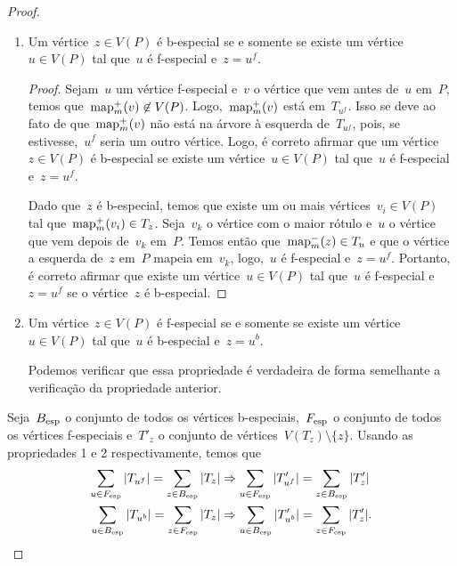 \begin{proof}
\begin{enumerate}
		\item Um vértice~${z\in V(P)}$ é b-especial se e somente 
		se existe um
		vértice~${u\in V(P)}$ tal que~$u$ é f-especial e~${z=u^f}$.
		\begin{proof}

		Sejam~$u$ um vértice f-especial 
		e~$v$ o vértice que vem antes 
		de~$u$ em~$P$, temos que~${\mathrm{map}^+_m(v)\not\in V(P)}$. 
		Logo,~$\mathrm{map}^+_m(v)$ está em~$T_{u^f}$.
		Isso se deve ao fato de que~$\mathrm{map}^+_m(v)$ não está na 
		árvore à esquerda
		de~$T_{u^f}$, pois, se estivesse,~$u^f$ seria um outro
		vértice.
		Logo, é correto afirmar que um vértice~${z\in V(P)}$ é b-especial
		se existe um vértice~${u\in V(P)}$ tal que~$u$		
		é f-especial e~${z=u^f}$. 

		Dado que~$z$ é b-especial,
		temos que existe um ou mais vértices~${v_i\in V(P)}$ tal
		que~${\mathrm{map}^+_m(v_i)\in T_{z}}$.
		Seja~$v_k$ o vértice com o maior rótulo e~$u$ o vértice 
		que vem depois de~$v_k$ em~$P$. 
		Temos então que~${\mathrm{map}^-_m(z)\in T_u}$ e que o vértice a esquerda
		de~$z$ em~$P$
		mapeia em~$v_k$, logo,~$u$ é f-especial e~${z=u^f}$.
		Portanto, é correto afirmar que existe um 
		vértice~${u\in V(P)}$ tal que~$u$ é f-especial e~${z=u^f}$
		se o vértice~$z$ é b-especial.
		\end{proof}

		\item Um vértice~${z\in V(P)}$ é f-especial se e somente se 
		existe um
		vértice~${u\in V(P)}$ tal que~$u$ é b-especial e~${z=u^b}$.

		Podemos verificar que essa propriedade é verdadeira de forma
		semelhante a verificação da propriedade anterior.
	\end{enumerate}

	Seja~$B_{\mathrm{esp}}$ 
	o conjunto de todos os vértices b-especiais,~$F_{\mathrm{esp}}$ o
	conjunto de todos os vértices f-especiais e~$T'_z$ o conjunto de 
	vértices~${V(T_z)\setminus \{z\}}$. 
	Usando as propriedades 
	1 e 2 respectivamente, temos que
	\begin{align}
		\displaystyle\sum_{u\in F_{\esp}}|T_{u^f}| = 
		\displaystyle\sum_{z\in B_{\esp}}|T_{z}| %
		&\Rightarrow
		\displaystyle\sum_{u\in F_{\esp}}|T_{u^f}'| = 
		\displaystyle\sum_{z\in B_{\esp}}|T_{z}'| \label{eq:4}\\
		\displaystyle\sum_{u\in B_{\esp}}|T_{u^b}| = 
		\displaystyle\sum_{z\in F_{\esp}}|T_{z}| %
		&\Rightarrow
		\displaystyle\sum_{u\in B_{\esp}}|T_{u^b}'| = 
		\displaystyle\sum_{z\in F_{\esp}}|T_{z}'| \label{eq:3}.
	\end{align}


\end{proof}
